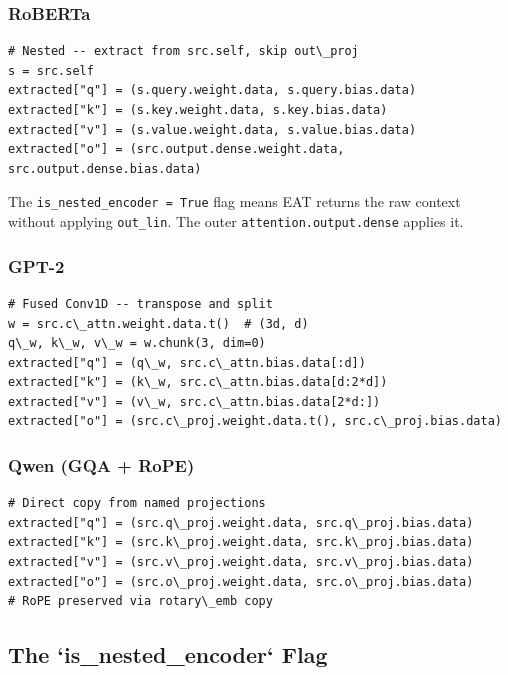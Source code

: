 \subsubsection{RoBERTa}

\begin{lstlisting}
# Nested -- extract from src.self, skip out\_proj
s = src.self
extracted["q"] = (s.query.weight.data, s.query.bias.data)
extracted["k"] = (s.key.weight.data, s.key.bias.data)
extracted["v"] = (s.value.weight.data, s.value.bias.data)
extracted["o"] = (src.output.dense.weight.data, src.output.dense.bias.data)
\end{lstlisting}

The \texttt{is\_nested\_encoder = True} flag means EAT returns the raw context 
without applying \texttt{out\_lin}. The outer \texttt{attention.output.dense} applies it.

\subsubsection{GPT-2}

\begin{lstlisting}
# Fused Conv1D -- transpose and split
w = src.c\_attn.weight.data.t()  # (3d, d)
q\_w, k\_w, v\_w = w.chunk(3, dim=0)
extracted["q"] = (q\_w, src.c\_attn.bias.data[:d])
extracted["k"] = (k\_w, src.c\_attn.bias.data[d:2*d])
extracted["v"] = (v\_w, src.c\_attn.bias.data[2*d:])
extracted["o"] = (src.c\_proj.weight.data.t(), src.c\_proj.bias.data)
\end{lstlisting}

\subsubsection{Qwen (GQA + RoPE)}

\begin{lstlisting}
# Direct copy from named projections
extracted["q"] = (src.q\_proj.weight.data, src.q\_proj.bias.data)
extracted["k"] = (src.k\_proj.weight.data, src.k\_proj.bias.data)
extracted["v"] = (src.v\_proj.weight.data, src.v\_proj.bias.data)
extracted["o"] = (src.o\_proj.weight.data, src.o\_proj.bias.data)
# RoPE preserved via rotary\_emb copy
\end{lstlisting}

\subsection{The `is\_nested\_encoder` Flag}

